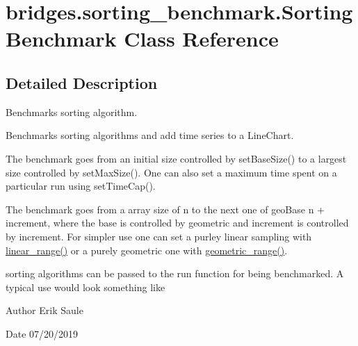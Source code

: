\hypertarget{classbridges_1_1sorting__benchmark_1_1_sorting_benchmark}{}\section{bridges.\+sorting\+\_\+benchmark.\+Sorting\+Benchmark Class Reference}
\label{classbridges_1_1sorting__benchmark_1_1_sorting_benchmark}


\subsection{Detailed Description}
Benchmarks sorting algorithm. 

Benchmarks sorting algorithms and add time series to a Line\+Chart.

The benchmark goes from an initial size controlled by set\+Base\+Size() to a largest size controlled by set\+Max\+Size(). One can also set a maximum time spent on a particular run using set\+Time\+Cap().

The benchmark goes from a array size of n to the next one of geo\+Base n + increment, where the base is controlled by geometric and increment is controlled by increment. For simpler use one can set a purley linear sampling with \mbox{\hyperlink{classbridges_1_1sorting__benchmark_1_1_sorting_benchmark_ab5bfca8680018f4c043a78b25dbc1948}{linear\+\_\+range()}} or a purely geometric one with \mbox{\hyperlink{classbridges_1_1sorting__benchmark_1_1_sorting_benchmark_ac9bc45a12b3ebab79d05785c01e4a99e}{geometric\+\_\+range()}}.

sorting algorithms can be passed to the run function for being benchmarked. A typical use would look something like


\begin{DoxyCode}{0}
\end{DoxyCode}


\begin{DoxyAuthor}{Author}
Erik Saule 
\end{DoxyAuthor}
\begin{DoxyDate}{Date}
07/20/2019 
\end{DoxyDate}
